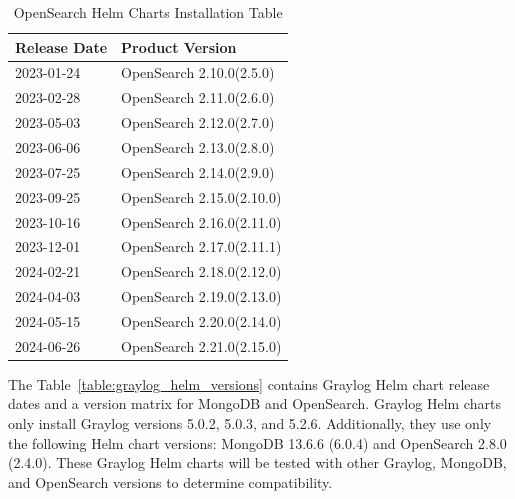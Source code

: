 \documentclass[../main.tex]{subfiles}
\begin{document}
\begin{table}[h]
\centering
\begin{tabular}{|l|l|}
\hline
\textbf{Release Date} & \textbf{Product Version} \\ \hline
2023-01-24 & OpenSearch 2.10.0(2.5.0) \\ \hline
2023-02-28 & OpenSearch 2.11.0(2.6.0) \\ \hline
2023-05-03 & OpenSearch 2.12.0(2.7.0) \\ \hline
2023-06-06 & OpenSearch 2.13.0(2.8.0) \\ \hline
2023-07-25 & OpenSearch 2.14.0(2.9.0) \\ \hline
2023-09-25 & OpenSearch 2.15.0(2.10.0) \\ \hline
2023-10-16 & OpenSearch 2.16.0(2.11.0) \\ \hline
2023-12-01 & OpenSearch 2.17.0(2.11.1) \\ \hline
2024-02-21 & OpenSearch 2.18.0(2.12.0) \\ \hline
2024-04-03 & OpenSearch 2.19.0(2.13.0) \\ \hline
2024-05-15 & OpenSearch 2.20.0(2.14.0) \\ \hline
2024-06-26 & OpenSearch 2.21.0(2.15.0) \\ \hline
\end{tabular}
\caption{OpenSearch Helm Charts Installation Table}
\label{table:opensearch_helm_installation_table}
\end{table}

The Table~\ref{table:graylog_helm_versions} contains Graylog Helm chart release dates and a version matrix for MongoDB and OpenSearch. Graylog Helm charts only install Graylog versions 5.0.2, 5.0.3, and 5.2.6. Additionally, they use only the following Helm chart versions: MongoDB 13.6.6 (6.0.4) and OpenSearch 2.8.0 (2.4.0). These Graylog Helm charts will be tested with other Graylog, MongoDB, and OpenSearch versions to determine compatibility.
\end{document}
